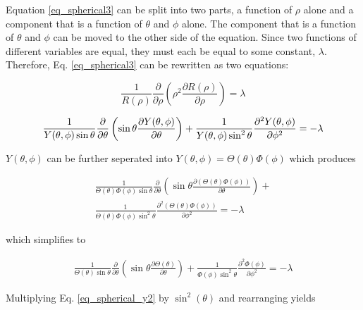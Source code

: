 \documentclass{article}
\numberwithin{equation}{subsection}
\begin{document}
Equation \ref{eq_spherical3} can be split into two parts, a function of $\rho$ alone and a component that is a function of $\theta$ and $\phi$ alone. The component that is a function of $\theta$ and $\phi$ can be moved to the other side of the equation. Since two functions of different variables are equal, they must each be equal to some constant, $\lambda$. Therefore, Eq. \ref{eq_spherical3} can be rewritten as two equations:

\begin{equation}\label{eq_spherical_r}
\frac{1}{R(\rho)}
\frac{\partial}{\partial \rho} 
\left( \rho^2 \frac{\partial R(\rho)}{\partial \rho}\right) = \lambda
\end{equation}

\begin{equation}\label{eq_spherical_tp}
\frac{1}{Y(\theta, \phi) \sin \theta}
\frac{\partial}{\partial \theta}
\left( \sin \theta \frac{\partial Y(\theta, \phi)}{\partial \theta}\right) 
+ \\
\frac{1}{Y(\theta, \phi) \sin^2 \theta} 
\frac{\partial^2 Y(\theta, \phi)}{\partial \phi^2} = -\lambda
\end{equation}

$Y(\theta, \phi)$ can be further seperated into $Y(\theta, \phi) = \Theta(\theta)\Phi(\phi)$ which produces

\begin{equation}\label{eq_spherical_y}
\begin{split}
\frac{1}{\Theta(\theta)\Phi(\phi) \sin \theta}
\frac{\partial}{\partial \theta}
\left( \sin \theta \frac{\partial (\Theta(\theta)\Phi(\phi))}{\partial \theta}\right) 
+ \\
\frac{1}{\Theta(\theta)\Phi(\phi) \sin^2 \theta} 
\frac{\partial^2 (\Theta(\theta)\Phi(\phi))}{\partial \phi^2} = -\lambda
\end{split}
\end{equation}

\noindent
which simplifies to

\begin{equation}\label{eq_spherical_y2}
\begin{split}
\frac{1}{\Theta(\theta) \sin \theta}
\frac{\partial}{\partial \theta}
\left( \sin \theta \frac{\partial \Theta(\theta)}{\partial \theta}\right) 
+ 
\frac{1}{\Phi(\phi) \sin^2 \theta} 
\frac{\partial^2 \Phi(\phi)}{\partial \phi^2} = -\lambda
\end{split}
\end{equation}

Multiplying Eq. \ref{eq_spherical_y2} by $\sin^2(\theta)$ and rearranging yields
\end{document}
